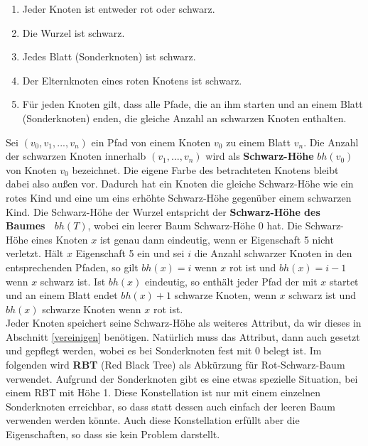 \documentclass[a4paper,12pt]{article}
\begin{document}
\begin{enumerate}
	\item Jeder Knoten ist entweder rot oder schwarz.
	\item Die Wurzel ist schwarz.
	\item Jedes Blatt (Sonderknoten) ist schwarz.
	\item Der Elternknoten eines roten Knotens ist schwarz.
	\item Für jeden Knoten gilt, dass alle Pfade, die an ihm starten und an einem Blatt (Sonderknoten) enden, die gleiche Anzahl an schwarzen Knoten enthalten. 
\end{enumerate}  
Sei $(v_0,v_1,...,v_n)$ ein Pfad von einem Knoten $v_0$ zu einem Blatt $v_n$. Die Anzahl der schwarzen Knoten innerhalb $(v_1,...,v_n)$ wird als \textbf{Schwarz-Höhe} $\mathit{bh(v_0)}$ von Knoten $v_0$ bezeichnet. Die eigene Farbe des betrachteten Knotens bleibt dabei also außen vor. Dadurch hat ein Knoten die gleiche Schwarz-Höhe wie ein rotes Kind und eine um eins erhöhte Schwarz-Höhe gegenüber einem schwarzen Kind. Die Schwarz-Höhe der Wurzel entspricht der \textbf{Schwarz-Höhe des Baumes~ $bh(T)$}, wobei ein leerer Baum Schwarz-Höhe $0$ hat. Die Schwarz-Höhe eines Knoten $x$ ist genau dann eindeutig, wenn er Eigenschaft 5 nicht verletzt. Hält $x$ Eigenschaft 5 ein und sei $i$ die Anzahl schwarzer Knoten in den entsprechenden Pfaden, so gilt $\mathit{bh(x)} = i$ wenn $x$ rot ist und $\mathit{bh(x)} = i - 1$ wenn $x$ schwarz ist. Ist $\mathit{bh(x)}$ eindeutig, so enthält jeder Pfad der mit $x$ startet und an einem Blatt endet $\mathit{bh(x)} + 1$ schwarze Knoten, wenn $x$ schwarz ist und  $\mathit{bh(x)}$ schwarze Knoten wenn $x$ rot ist.\\ Jeder Knoten speichert seine Schwarz-Höhe als weiteres Attribut, da wir dieses in Abschnitt \ref{vereinigen} benötigen. Natürlich muss das Attribut, dann auch gesetzt und gepflegt werden, wobei es bei Sonderknoten fest mit $0$ belegt ist. Im folgenden wird \textbf{RBT} (Red Black Tree) als Abkürzung für Rot-Schwarz-Baum verwendet. Aufgrund der Sonderknoten gibt es eine etwas spezielle Situation, bei einem RBT mit Höhe 1. Diese Konstellation ist nur mit einem einzelnen Sonderknoten erreichbar, so dass statt dessen auch einfach der leeren Baum verwenden werden könnte. Auch diese Konstellation erfüllt aber die Eigenschaften, so dass sie kein Problem darstellt. \\
\end{document}
